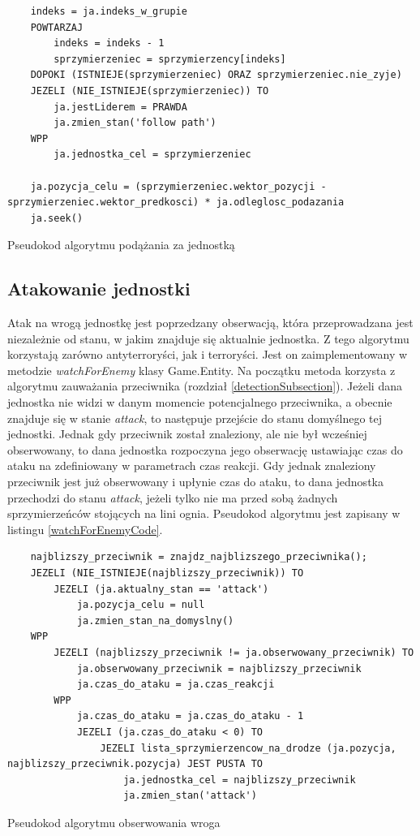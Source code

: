 \begin{table}
\begin{center}
\begin{lstlisting}
	indeks = ja.indeks_w_grupie
	POWTARZAJ
		indeks = indeks - 1
		sprzymierzeniec = sprzymierzency[indeks]
	DOPOKI (ISTNIEJE(sprzymierzeniec) ORAZ sprzymierzeniec.nie_zyje)
	JEZELI (NIE_ISTNIEJE(sprzymierzeniec)) TO
		ja.jestLiderem = PRAWDA
		ja.zmien_stan('follow path')
	WPP
		ja.jednostka_cel = sprzymierzeniec

	ja.pozycja_celu = (sprzymierzeniec.wektor_pozycji - sprzymierzeniec.wektor_predkosci) * ja.odleglosc_podazania
	ja.seek()
\end{lstlisting}
\caption {Pseudokod algorytmu podążania za jednostką}
\label{followEntityCode}
\end{center}
\end{table}

\subsection{Atakowanie jednostki}
Atak na wrogą jednostkę jest poprzedzany obserwacją, która przeprowadzana jest niezależnie od stanu, w jakim znajduje się aktualnie jednostka. Z tego algorytmu korzystają zarówno antyterroryści, jak i terroryści. Jest on zaimplementowany w metodzie \emph{watchForEnemy} klasy Game.Entity. Na początku metoda korzysta z algorytmu zauważania przeciwnika (rozdział \ref{detectionSubsection}). Jeżeli dana jednostka nie widzi w danym momencie potencjalnego przeciwnika, a obecnie znajduje się w stanie \emph{attack}, to następuje przejście do stanu domyślnego tej jednostki. Jednak gdy przeciwnik został znaleziony, ale nie był wcześniej obserwowany, to dana jednostka rozpoczyna jego obserwację ustawiając czas do ataku na zdefiniowany w parametrach czas reakcji. Gdy jednak znaleziony przeciwnik jest już obserwowany i upłynie czas do ataku, to dana jednostka przechodzi do stanu \emph{attack}, jeżeli tylko nie ma przed sobą żadnych sprzymierzeńców stojących na lini ognia. Pseudokod algorytmu jest zapisany w listingu \ref{watchForEnemyCode}.

\begin{table}
\begin{center}
\begin{lstlisting}
	najblizszy_przeciwnik = znajdz_najblizszego_przeciwnika();
	JEZELI (NIE_ISTNIEJE(najblizszy_przeciwnik)) TO
		JEZELI (ja.aktualny_stan == 'attack')
			ja.pozycja_celu = null
			ja.zmien_stan_na_domyslny()
	WPP
		JEZELI (najblizszy_przeciwnik != ja.obserwowany_przeciwnik) TO
			ja.obserwowany_przeciwnik = najblizszy_przeciwnik
			ja.czas_do_ataku = ja.czas_reakcji
		WPP
			ja.czas_do_ataku = ja.czas_do_ataku - 1
			JEZELI (ja.czas_do_ataku < 0) TO
				JEZELI lista_sprzymierzencow_na_drodze (ja.pozycja, najblizszy_przeciwnik.pozycja) JEST PUSTA TO
					ja.jednostka_cel = najblizszy_przeciwnik
					ja.zmien_stan('attack')									
\end{lstlisting}
\caption {Pseudokod algorytmu obserwowania wroga}
\label{watchForEnemyCode}
\end{center}
\end{table}

